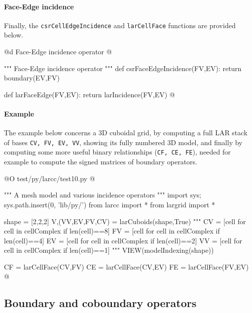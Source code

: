 \documentclass[11pt,oneside]{article}	%
\begin{document}
\paragraph{Face-Edge incidence}
Finally, the \texttt{csrCellEdgeIncidence} and \texttt{larCellFace} functions are provided below.

@d Face-Edge incidence operator
@{""" Face-Edge incidence operator """
def csrFaceEdgeIncidence(FV,EV):
	return boundary(EV,FV)

def larFaceEdge(FV,EV):
	return larIncidence(FV,EV)
@}


\paragraph{Example}
The example below concerns a 3D cuboidal grid, by computing a full LAR stack of bases
\texttt{CV, FV, EV, VV}, showing its fully numbered 3D model, and finally by computing
some more useful binary relationships (\texttt{CF, CE, FE}), needed for example to compute the signed matrices of boundary operators.

@O test/py/larcc/test10.py
@{""" A mesh model and various incidence operators """
import sys; sys.path.insert(0, 'lib/py/')
from larcc import *
from largrid import *

shape = [2,2,2]
V,(VV,EV,FV,CV) = larCuboids(shape,True)
"""
CV = [cell for cell in cellComplex if len(cell)==8]
FV = [cell for cell in cellComplex if len(cell)==4]
EV = [cell for cell in cellComplex if len(cell)==2]
VV = [cell for cell in cellComplex if len(cell)==1]
"""
VIEW(modelIndexing(shape))

CF = larCellFace(CV,FV)
CE = larCellFace(CV,EV)
FE = larCellFace(FV,EV)
@}




\subsection{Boundary and coboundary operators}
\end{document}
